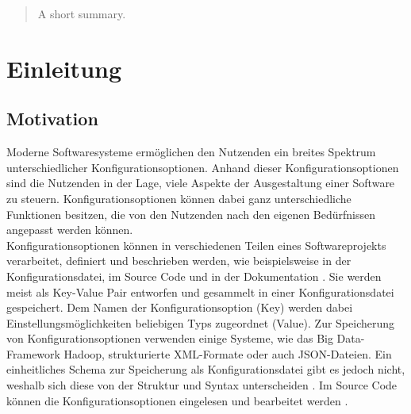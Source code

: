 \documentclass[german,bachelor]{swsLeipzig}
\begin{document}
\begin{frontmatter}
  \begin{abstract}
    A short summary.
  \end{abstract}

  \tableofcontents


  \listoffigures %
  \listoftables %

\end{frontmatter}

\chapter{Einleitung}\label{Einleitung}

\section{Motivation}
Moderne Softwaresysteme erm\"oglichen den Nutzenden ein breites Spektrum unterschiedlicher Konfigurationsoptionen.
Anhand dieser Konfigurationsoptionen sind die Nutzenden in der Lage, viele Aspekte der Ausgestaltung einer Software zu steuern.
Konfigurationsoptionen k\"onnen dabei ganz unterschiedliche Funktionen besitzen, die von den Nutzenden nach den eigenen Bed\"urfnissen angepasst werden k\"onnen.\\

Konfigurationsoptionen können in verschiedenen Teilen eines Softwareprojekts verarbeitet, definiert und beschrieben werden,
wie beispielsweise in der Konfigurationsdatei, im Source Code und in der Dokumentation \cite[]{7774519}.
Sie werden meist als Key-Value Pair entworfen und gesammelt in einer Konfigurationsdatei gespeichert.
Dem Namen der Konfigurationsoption (Key) werden dabei Einstellungsmöglichkeiten beliebigen Typs zugeordnet (Value).
Zur Speicherung von Konfigurationsoptionen verwenden einige Systeme, wie das Big Data-Framework Hadoop, strukturierte XML-Formate oder auch JSON-Dateien.
Ein einheitliches Schema zur Speicherung als Konfigurationsdatei gibt es jedoch nicht, weshalb sich diese von der Struktur und Syntax unterscheiden \cite[]{10.1145/1985793.1985812}.
Im Source Code können die Konfigurationsoptionen eingelesen und bearbeitet werden \cite[]{7774519}.\\
\end{document}
